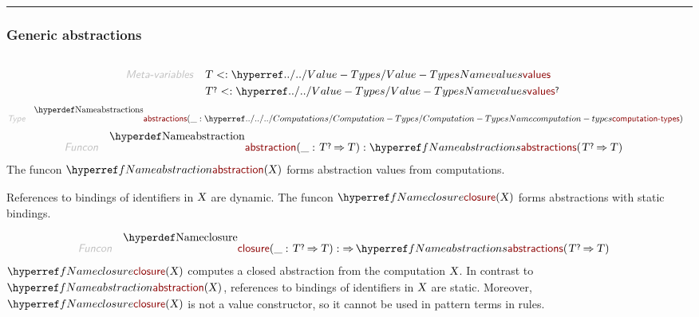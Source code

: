

\begin{center}
\rule{3in}{0.4pt}
\end{center}

\subsubsection{Generic abstractions}\hypertarget{generic-abstractions}{}\label{generic-abstractions}

\begin{align*}
  [ \
  \KEY{Type} \quad & \NAMEREF{abstractions} \\
  \KEY{Funcon} \quad & \NAMEREF{abstraction} \\
  \KEY{Funcon} \quad & \NAMEREF{closure} \\
  \KEY{Funcon} \quad & \NAMEREF{enact}
  \ ]
\end{align*}
\begin{align*}
  \KEY{Meta-variables} \quad
  & \VAR{T} <: \NAMEHYPER{../..}{Value-Types}{values} \qquad \\& \VAR{T}\QUERY <: \NAMEHYPER{../..}{Value-Types}{values}\QUERY
\end{align*}
\begin{align*}
  \KEY{Type} \quad 
  & \NAMEDECL{abstractions}(
                       \_ : \NAMEHYPER{../../../Computations}{Computation-Types}{computation-types})  
\end{align*}
\begin{align*}
  \KEY{Funcon} \quad
  & \NAMEDECL{abstraction}(
                       \_ : \VAR{T}\QUERY \TO \VAR{T}) 
    : \NAMEREF{abstractions}
        (  \VAR{T}\QUERY \TO \VAR{T} ) 
\end{align*}
The funcon $\SHADE{\NAMEREF{abstraction}
           (  \VAR{X} )}$ forms abstraction values from computations.

References to bindings of identifiers in $\SHADE{\VAR{X}}$ are dynamic.
  The funcon $\SHADE{\NAMEREF{closure}
           (  \VAR{X} )}$ forms abstractions with static bindings.

\begin{align*}
  \KEY{Funcon} \quad
  & \NAMEDECL{closure}(
                       \_ : \VAR{T}\QUERY \TO \VAR{T}) 
    :  \TO \NAMEREF{abstractions}
                     (  \VAR{T}\QUERY \TO \VAR{T} ) 
\end{align*}
$\SHADE{\NAMEREF{closure}
           (  \VAR{X} )}$ computes a closed abstraction from the computation $\SHADE{\VAR{X}}$.
  In contrast to $\SHADE{\NAMEREF{abstraction}
           (  \VAR{X} )}$, references to bindings of identifiers
  in $\SHADE{\VAR{X}}$ are static. Moreover, $\SHADE{\NAMEREF{closure}
           (  \VAR{X} )}$ is not a value constructor,
  so it cannot be used in pattern terms in rules.

